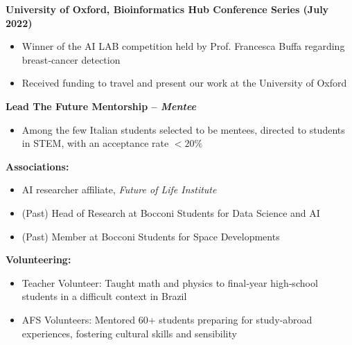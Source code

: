 
\noindent\textbf{University of Oxford, Bioinformatics Hub Conference Series (July 2022)}
\begin{itemize}[noitemsep,topsep=0pt]
\item Winner of the AI LAB competition held by Prof. Francesca Buffa regarding breast‑cancer detection
\item Received funding to travel and present our work at the University of Oxford
\end{itemize}

\medskip
\noindent\textbf{Lead The Future Mentorship – \textit{Mentee}}
\begin{itemize}[noitemsep,topsep=0pt]
\item Among the few Italian students selected to be mentees, directed to students in STEM, with an acceptance rate  $<20\%$
\end{itemize}

\medskip
\noindent\textbf{ Associations:}
\begin{itemize}[noitemsep,topsep=0pt]
\item AI researcher affiliate,\textit{ Future of Life Institute}
\item (Past) Head of Research at Bocconi Students for Data Science and AI
\item (Past) Member at Bocconi Students for Space Developments
\end{itemize}

\medskip
\noindent\textbf{Volunteering:}
\begin{itemize}[noitemsep,topsep=0pt]
\item Teacher Volunteer: Taught math and physics to final‑year high‑school students in a difficult context in Brazil
\item AFS Volunteers: Mentored 60+ students preparing for study‑abroad experiences, fostering cultural skills and sensibility
\end{itemize}

